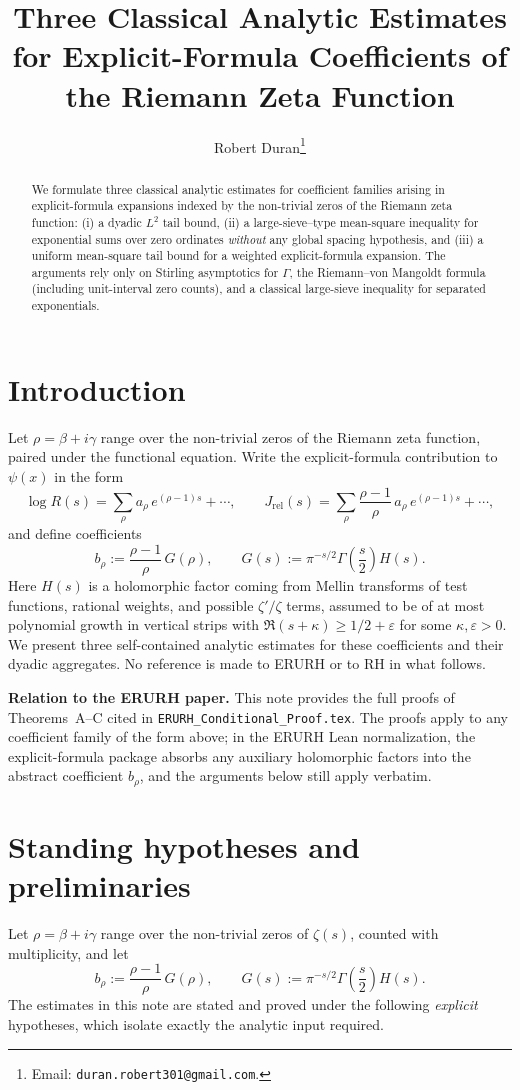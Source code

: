 \documentclass[11pt]{article}
\title{Three Classical Analytic Estimates for Explicit-Formula Coefficients of the Riemann Zeta Function}
\author{Robert Duran\thanks{Email: \texttt{duran.robert301@gmail.com}.}}
\date{}
\theoremstyle{plain}
\theoremstyle{definition}
\begin{document}
\maketitle

\begin{abstract}
We formulate three classical analytic estimates for coefficient families arising in explicit-formula expansions indexed by the non-trivial zeros of the Riemann zeta function: (i) a dyadic $L^2$ tail bound, (ii) a large-sieve--type mean-square inequality for exponential sums over zero ordinates \emph{without} any global spacing hypothesis, and (iii) a uniform mean-square tail bound for a weighted explicit-formula expansion. The arguments rely only on Stirling asymptotics for $\Gamma$, the Riemann--von Mangoldt formula (including unit-interval zero counts), and a classical large-sieve inequality for separated exponentials.
\end{abstract}

\section{Introduction}
Let $\rho = \beta + i\gamma$ range over the non-trivial zeros of the Riemann zeta function, paired under the functional equation. Write the explicit-formula contribution to $\psi(x)$ in the form
\[
  \log R(s) = \sum_{\rho} a_\rho\, e^{(\rho-1)s} + \cdots, \qquad
  J_{\mathrm{rel}}(s) = \sum_{\rho} \frac{\rho-1}{\rho}\, a_\rho\, e^{(\rho-1)s} + \cdots,
\]
and define coefficients
\[
  b_\rho := \frac{\rho-1}{\rho}\, G(\rho), \qquad
  G(s) := \pi^{-s/2} \Gamma\!\left(\frac{s}{2}\right) H(s).
\]
Here $H(s)$ is a holomorphic factor coming from Mellin transforms of test functions, rational weights, and possible $\zeta'/\zeta$ terms, assumed to be of at most polynomial growth in vertical strips with $\Re(s+\kappa)\ge 1/2+\varepsilon$ for some $\kappa,\varepsilon>0$. We present three self-contained analytic estimates for these coefficients and their dyadic aggregates. No reference is made to ERURH or to RH in what follows.

\medskip
\noindent\textbf{Relation to the ERURH paper.} This note provides the full proofs
of Theorems~A--C cited in \texttt{ERURH\_Conditional\_Proof.tex}. The proofs apply
to any coefficient family of the form above; in the ERURH Lean normalization,
the explicit-formula package absorbs any auxiliary holomorphic factors into the
abstract coefficient $b_\rho$, and the arguments below still apply verbatim.

\section{Standing hypotheses and preliminaries}
Let $\rho=\beta+i\gamma$ range over the non-trivial zeros of $\zeta(s)$, counted with multiplicity, and let
\[
  b_\rho := \frac{\rho-1}{\rho}\,G(\rho),
  \qquad
  G(s) := \pi^{-s/2}\Gamma\!\left(\frac{s}{2}\right)H(s).
\]
The estimates in this note are stated and proved under the following \emph{explicit} hypotheses, which isolate exactly the analytic input required.
\end{document}
